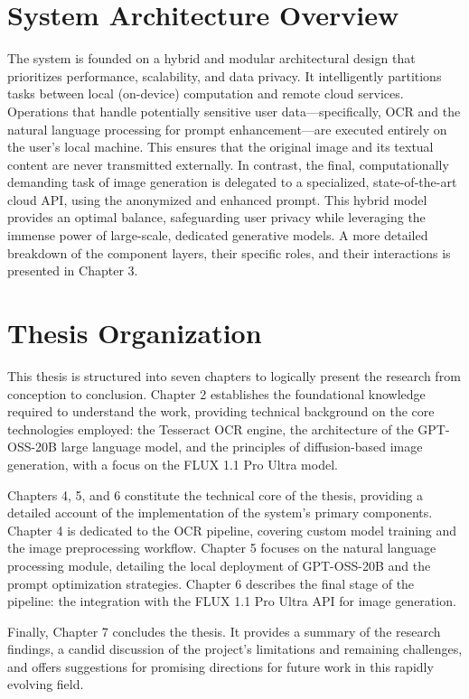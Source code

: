 \section{System Architecture Overview}
The system is founded on a hybrid and modular architectural design that prioritizes performance, scalability, and data privacy. It intelligently partitions tasks between local (on-device) computation and remote cloud services. Operations that handle potentially sensitive user data—specifically, OCR and the natural language processing for prompt enhancement—are executed entirely on the user's local machine. This ensures that the original image and its textual content are never transmitted externally. In contrast, the final, computationally demanding task of image generation is delegated to a specialized, state-of-the-art cloud API, using the anonymized and enhanced prompt. This hybrid model provides an optimal balance, safeguarding user privacy while leveraging the immense power of large-scale, dedicated generative models. A more detailed breakdown of the component layers, their specific roles, and their interactions is presented in Chapter 3.

\section{Thesis Organization}
This thesis is structured into seven chapters to logically present the research from conception to conclusion. Chapter 2 establishes the foundational knowledge required to understand the work, providing technical background on the core technologies employed: the Tesseract OCR engine, the architecture of the GPT-OSS-20B large language model, and the principles of diffusion-based image generation, with a focus on the FLUX 1.1 Pro Ultra model.

Chapters 4, 5, and 6 constitute the technical core of the thesis, providing a detailed account of the implementation of the system's primary components. Chapter 4 is dedicated to the OCR pipeline, covering custom model training and the image preprocessing workflow. Chapter 5 focuses on the natural language processing module, detailing the local deployment of GPT-OSS-20B and the prompt optimization strategies. Chapter 6 describes the final stage of the pipeline: the integration with the FLUX 1.1 Pro Ultra API for image generation.

Finally, Chapter 7 concludes the thesis. It provides a summary of the research findings, a candid discussion of the project's limitations and remaining challenges, and offers suggestions for promising directions for future work in this rapidly evolving field.

